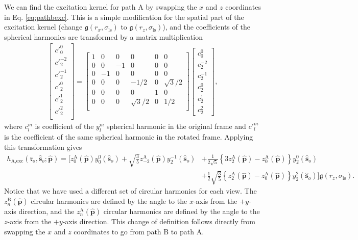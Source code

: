 \documentclass[11pt]{article}
\providecommand{\ro}{\mathbf{\mathfrak{r}}_o}
\providecommand{\so}{\mathbf{\hat{s}}_o}
\providecommand{\mh}[1]{\mathbf{\hat{#1}}}
\providecommand{\mf}[1]{\mathfrak{#1}}
\providecommand{\tx}[1]{\text{#1}}
\begin{document}
We can find the excitation kernel for path A by swapping the $x$ and $z$
coordinates in Eq. \ref{eq:pathbexc}. This is a simple modification for the
spatial part of the excitation kernel (change $\mf{g}(r_x, \sigma_{\tx{ls}})$
to $\mf{g}(r_z, \sigma_{\tx{ls}})$), and the coefficients of the spherical
harmonics are transformed by a matrix multiplication
\begin{align}
  \begin{bmatrix}
    {c'}_0^{0}\\ {c'}_2^{-2}\\ {c'}_2^{-1}\\ {c'}_2^0\\ {c'}_2^1\\ {c'}_2^2\\
  \end{bmatrix} =
  \begin{bmatrix}
      1&0&0&0&0&0\\
      0&0&-1&0&0&0\\
      0&-1&0&0&0&0\\
      0&0&0&-1/2&0&\sqrt{3}/2\\
      0&0&0&0&1&0\\
      0&0&0&\sqrt{3}/{2}&0&1/2\\
  \end{bmatrix}
  \begin{bmatrix}
    {c}_0^{0}\\ {c}_2^{-2}\\ {c}_2^{-1}\\ {c}_2^0\\ {c}_2^1\\ {c}_2^2
  \end{bmatrix}, \label{eq:transform}
\end{align}
where $c_l^m$ is coefficient of the $y_l^m$ spherical harmonic in the original
frame and ${c'}_l^m$ is the coefficient of the same spherical harmonic in the
rotated frame. Applying this transformation gives
\begin{align}
  h_{\tx{A}, \tx{exc}}(\ro, \so; \mh{p}) = \Bigg[z_{0}^{\tx{A}}(\mh{p})y_0^0(\so) + \sqrt{\frac{3}{5}}z^{\tx{A}}_{-2}(\mh{p})y_2^{-1}(\so) &+ \frac{1}{2\sqrt{5}}\left\{3z_2^{\tx{A}}(\mh{p}) - z_{0}^{\tx{A}}(\mh{p}) \right\} y_2^0(\so)\nonumber \\ &+ \frac{1}{2}\sqrt{\frac{3}{5}}\left\{z^{\tx{A}}_{2}(\mh{p}) - z_{0}^{\tx{A}}(\mh{p})\right\}y_2^{2}(\so)\Bigg]\mf{g}(r_z, \sigma_{\tx{ls}}).\label{eq:pathaexc}
\end{align}
Notice that we have used a different set of circular harmonics for each view.
The $z_n^{\tx{B}}(\mh{p})$ circular harmonics are defined by the angle to the $x$-axis
from the $+y$-axis direction, and the $z_n^{\tx{A}}(\mh{p})$ circular harmonics are
defined by the angle to the $z$-axis from the $+y$-axis direction. This change
of definition follows directly from swapping the $x$ and $z$ coordinates to go
from path B to path A.
\end{document}
